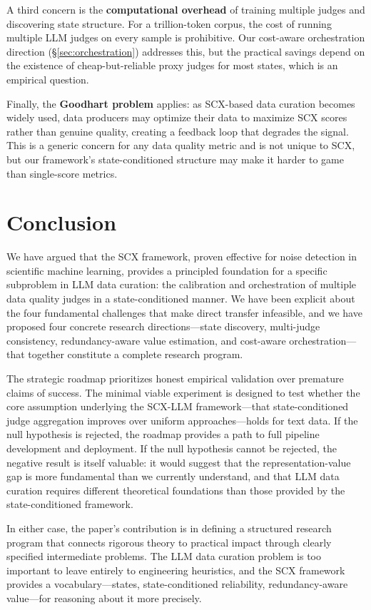 \documentclass[11pt,twocolumn]{article}
\begin{document}
A third concern is the \textbf{computational overhead} of training multiple judges and discovering state structure. For a trillion-token corpus, the cost of running multiple LLM judges on every sample is prohibitive. Our cost-aware orchestration direction (\S\ref{sec:orchestration}) addresses this, but the practical savings depend on the existence of cheap-but-reliable proxy judges for most states, which is an empirical question.

Finally, the \textbf{Goodhart problem} applies: as SCX-based data curation becomes widely used, data producers may optimize their data to maximize SCX scores rather than genuine quality, creating a feedback loop that degrades the signal. This is a generic concern for any data quality metric and is not unique to SCX, but our framework's state-conditioned structure may make it harder to game than single-score metrics.

\section{Conclusion}

We have argued that the SCX framework, proven effective for noise detection in scientific machine learning, provides a principled foundation for a specific subproblem in LLM data curation: the calibration and orchestration of multiple data quality judges in a state-conditioned manner. We have been explicit about the four fundamental challenges that make direct transfer infeasible, and we have proposed four concrete research directions---state discovery, multi-judge consistency, redundancy-aware value estimation, and cost-aware orchestration---that together constitute a complete research program.

The strategic roadmap prioritizes honest empirical validation over premature claims of success. The minimal viable experiment is designed to test whether the core assumption underlying the SCX-LLM framework---that state-conditioned judge aggregation improves over uniform approaches---holds for text data. If the null hypothesis is rejected, the roadmap provides a path to full pipeline development and deployment. If the null hypothesis cannot be rejected, the negative result is itself valuable: it would suggest that the representation-value gap is more fundamental than we currently understand, and that LLM data curation requires different theoretical foundations than those provided by the state-conditioned framework.

In either case, the paper's contribution is in defining a structured research program that connects rigorous theory to practical impact through clearly specified intermediate problems. The LLM data curation problem is too important to leave entirely to engineering heuristics, and the SCX framework provides a vocabulary---states, state-conditioned reliability, redundancy-aware value---for reasoning about it more precisely.
\end{document}
